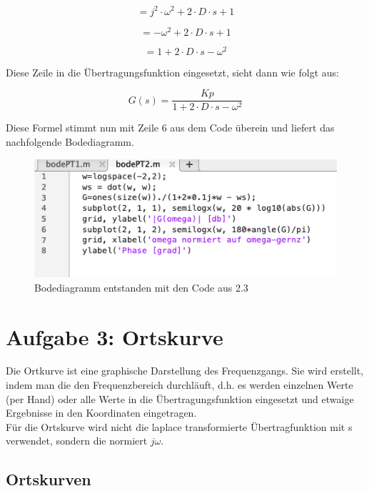 \documentclass{article}
\begin{document}
			$$= j^2 \cdot \omega^2 + 2 \cdot D \cdot s + 1 $$

			$$= - \omega^2 + 2 \cdot D \cdot s + 1$$

			$$= 1 + 2 \cdot D \cdot s - \omega^2 $$
			
			Diese Zeile in die Übertragungsfunktion eingesetzt, sieht dann wie folgt aus:
			
			$$G(s) = \frac{Kp}{1 + 2 \cdot D \cdot s - \omega^2}$$
			
			Diese Formel stimmt nun mit Zeile 6 aus dem Code überein und liefert das nachfolgende Bodediagramm.
			\begin{figure}
				\includegraphics[scale = 0.3, center]{./bodePT2.png}
				\caption{Bodediagramm entstanden mit den Code aus 2.3}
				\label{fig2: Bodediagramm}
			\end{figure}
\newpage
	\section{Aufgabe 3: Ortskurve}
		Die Ortkurve ist eine graphische Darstellung des Frequenzgangs. Sie wird erstellt, indem man die den Frequenzbereich durchläuft, d.h. es werden einzelnen Werte (per Hand) oder alle Werte in die Übertragungsfunktion eingesetzt und etwaige Ergebnisse in den Koordinaten eingetragen.\\
		Für die Ortskurve wird nicht die laplace transformierte Übertragfunktion mit s verwendet, sondern die normiert $j\omega$.
	
		\subsection{Ortskurven}
\end{document}
